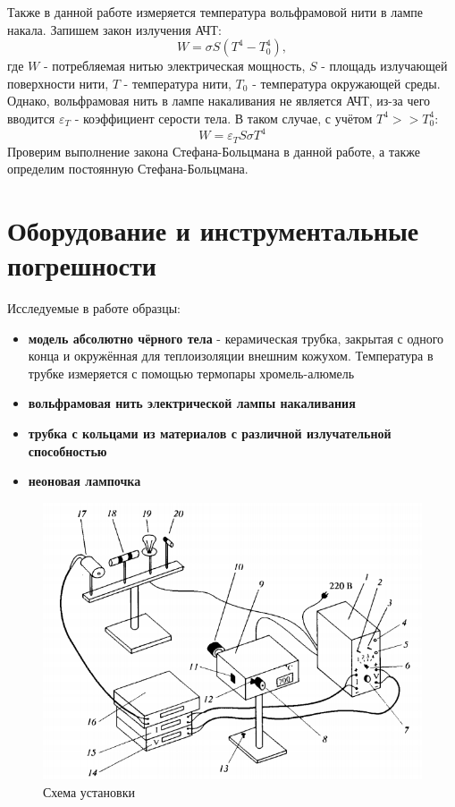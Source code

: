 \documentclass[a4paper,12pt]{article} %
\begin{document}
Также в данной работе измеряется температура вольфрамовой нити в лампе накала. Запишем закон излучения АЧТ:
\begin{equation}
    W = \sigma S (T^4 - T_0^4),
\end{equation}
где $W$ - потребляемая нитью электрическая мощность, $S$ - площадь излучающей поверхности нити, $T$ - температура нити, $T_0$ - температура окружающей среды. Однако, вольфрамовая нить в лампе накаливания не является АЧТ, из-за чего вводится $\varepsilon_T$ - коэффициент серости тела. В таком случае, с учётом $T^4 >> T_0 ^ 4$:
\begin{equation}
    W = \varepsilon_T S \sigma T^4
\end{equation}
Проверим выполнение закона Стефана-Больцмана в данной работе, а также определим постоянную Стефана-Больцмана.


\section * {Оборудование и инструментальные погрешности}

Исследуемые в работе образцы:
\begin{itemize}
    \item \textbf{модель абсолютно чёрного тела} - керамическая трубка, закрытая с одного конца и окружённая для теплоизоляции внешним кожухом. Температура в трубке измеряется с помощью термопары хромель-алюмель
    \item \textbf{вольфрамовая нить электрической лампы накаливания}
    \item \textbf{трубка с кольцами из материалов с различной излучательной способностью}
    \item \textbf{неоновая лампочка}
\end{itemize}

\begin{figure}[h]
    \centering
    \includegraphics[width=0.8\linewidth]{fig1.PNG}
    \caption{Схема установки}
    \label{fig:scheme}
\end{figure}
\end{document}

